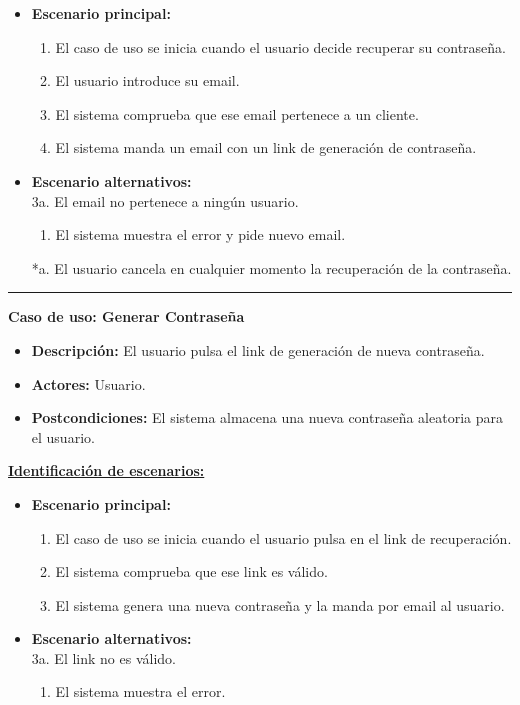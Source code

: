 \begin{itemize}\renewcommand{\labelitemi}{$\circ$}
 \item \textbf{Escenario principal:}
         \begin{enumerate}
          \item El caso de uso se inicia cuando el usuario decide recuperar su contraseña.
          \item El usuario introduce su email.
          \item El sistema comprueba que ese email pertenece a un cliente.
          \item El sistema manda un email con un link de generación de contraseña.
         \end{enumerate}
  \item \textbf{Escenario alternativos:}\\
  			3a. El email no pertenece a ningún usuario.
  			\begin{enumerate}
  			\item El sistema muestra el error y pide nuevo email.
  			\end{enumerate}
          *a. El usuario cancela en cualquier momento la recuperación de la contraseña.
\end{itemize}

\smallskip
\hrule height 1pt
\smallskip
\textbf{Caso de uso: Generar Contraseña}
\begin{itemize}\renewcommand{\labelitemi}{$\cdot$}
 \item \textbf{Descripción:} El usuario pulsa el link de generación de nueva contraseña.
  \item \textbf{Actores:} Usuario.
  \item \textbf{Postcondiciones:} El sistema almacena una nueva contraseña aleatoria para el usuario.
\end{itemize}
\underline{\textbf{Identificación de escenarios:}}
\begin{itemize}\renewcommand{\labelitemi}{$\circ$}
 \item \textbf{Escenario principal:}
         \begin{enumerate}
          \item El caso de uso se inicia cuando el usuario pulsa en el link de recuperación.
          \item El sistema comprueba que ese link es válido.
          \item El sistema genera una nueva contraseña y la manda por email al usuario.
         \end{enumerate}
  \item \textbf{Escenario alternativos:}\\
  			3a. El link no es válido.
  			\begin{enumerate}
  			\item El sistema muestra el error.
  			\end{enumerate}
\end{itemize}

